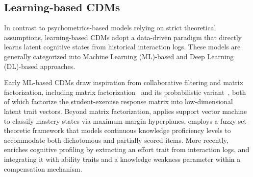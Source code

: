 \documentclass[a4paper,runningheads]{llncs}
\begin{document}

\subsection{Learning-based CDMs}
In contrast to psychometrics-based models relying on strict theoretical assumptions, learning-based CDMs adopt a data-driven paradigm that directly learns latent cognitive states from historical interaction logs. These models are generally categorized into Machine Learning (ML)-based and Deep Learning (DL)-based approaches.

Early ML-based CDMs draw inspiration from collaborative filtering and matrix factorization, including matrix factorization~\cite{MF} and its probabilistic variant~\cite{PMF}, both of which factorize the student-exercise response matrix into low-dimensional latent trait vectors. Beyond matrix factorization, \cite{SVM} applies support vector machine to classify mastery states via maximum-margin hyperplanes. \cite{FuzzyCDF} employs a fuzzy set-theoretic framework that models continuous knowledge proficiency levels to accommodate both dichotomous and partially scored items. More recently, \cite{MvCRF} enriches cognitive profiling by extracting an effort trait from interaction logs, and integrating it with ability traits and a knowledge weakness parameter within a compensation mechanism.
\end{document}
